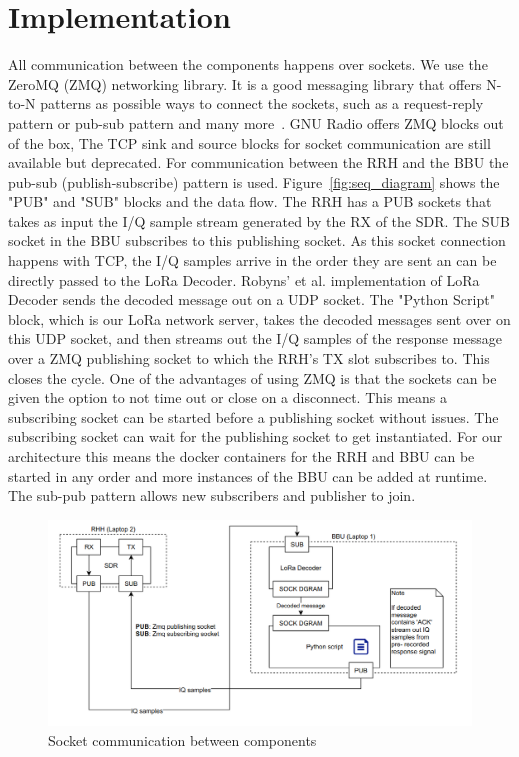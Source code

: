 \section{Implementation}
All communication between the components happens over sockets. We use the ZeroMQ (ZMQ) networking library.
It is a good messaging library that offers N-to-N patterns as possible ways to connect the sockets, such as a request-reply pattern
or pub-sub pattern and many more~\cite{zeromq}.
GNU Radio offers ZMQ blocks out of the box, The TCP sink and source blocks for socket communication are still available but deprecated. 
For communication between the RRH and the BBU the pub-sub (publish-subscribe) pattern is used.
Figure~\ref{fig:seq_diagram} shows the "PUB" and "SUB" blocks and the data flow.
The RRH has a PUB sockets that takes as input the I/Q sample stream generated by the RX of the SDR.
The SUB socket in the BBU subscribes to this publishing socket. As this socket connection happens with TCP, the I/Q samples arrive in the order
they are sent an can be directly passed to the LoRa Decoder. Robyns' et al. implementation of LoRa Decoder sends the decoded message 
out on a UDP socket.  The "Python Script" block, which is our LoRa network server, takes the decoded messages sent over on this UDP socket,
and then streams out  the 
I/Q samples of the response message over a ZMQ publishing socket to which the RRH's TX slot subscribes to. This closes the cycle.
One of the advantages of using ZMQ is that the sockets can be given the option to not time out or close on a disconnect. This means a subscribing socket 
can be started before a publishing socket without issues. The subscribing socket can wait for the publishing socket to get instantiated. For our architecture 
this means the docker containers for the RRH and BBU can be started in any order and more instances of the BBU can be added at runtime. The sub-pub pattern 
allows new subscribers and publisher to join.

\begin{figure}[h]
    \centering
    \includegraphics[width=1\textwidth]{figures/impl_diagram.png}
    \caption{Socket communication between components}
    \label{fig:impl_diagram}
\end{figure}

